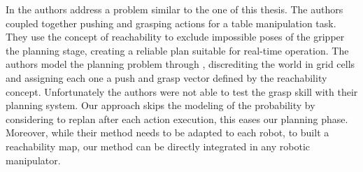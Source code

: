 

In \citep{coelhoplanning} the authors address a problem similar to the one of this thesis. The authors coupled  together pushing and grasping actions for a table manipulation task.
They use the concept of reachability \citep{vahrenkamp2013robot}  to  exclude impossible poses of the gripper  the planning stage, creating a reliable plan suitable for real-time operation. The authors model the planning problem through , discrediting  the world in grid cells and assigning  each one a push and grasp vector defined by the reachability concept. Unfortunately the authors were not able to test the grasp skill with their planning system. 
Our approach skips the modeling of the probability by considering to replan after each action execution, this eases our planning phase.  Moreover, while their method needs to be adapted to each robot, to built a reachability map, our method can be directly integrated in any robotic manipulator. 

